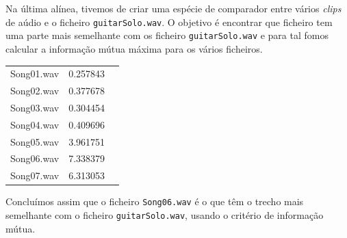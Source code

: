 \documentclass[12pt]{article}
\begin{document}
  Na última alínea, tivemos de criar uma espécie de comparador
  entre vários \textit{clips} de aúdio e o ficheiro \texttt{guitarSolo.wav}.
  O objetivo é encontrar que ficheiro tem uma parte mais semelhante com
  os ficheiro \texttt{guitarSolo.wav} e para tal fomos calcular a informação mútua
  máxima para os vários ficheiros.

  \begin{tabular}{ l c r }
    Song01.wav & 0.257843 \\
    Song02.wav & 0.377678 \\
    Song03.wav & 0.304454 \\
    Song04.wav & 0.409696 \\
    Song05.wav & 3.961751 \\
    Song06.wav & 7.338379 \\
    Song07.wav & 6.313053 \\
  \end{tabular}

  Concluímos assim que o ficheiro \texttt{Song06.wav} é o que têm o trecho mais semelhante com o ficheiro \texttt{guitarSolo.wav}, usando o critério de informação mútua.
\end{document}
